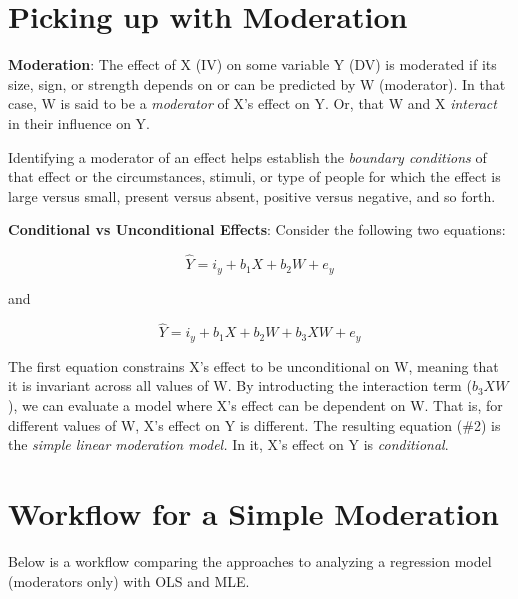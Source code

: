 \documentclass[
  11pt,
]{book}
\begin{document}
\hypertarget{picking-up-with-moderation}{%
\section{Picking up with Moderation}\label{picking-up-with-moderation}}

\textbf{Moderation}: The effect of X (IV) on some variable Y (DV) is moderated if its size, sign, or strength depends on or can be predicted by W (moderator). In that case, W is said to be a \emph{moderator} of X's effect on Y. Or, that W and X \emph{interact} in their influence on Y.

Identifying a moderator of an effect helps establish the \emph{boundary conditions} of that effect or the circumstances, stimuli, or type of people for which the effect is large versus small, present versus absent, positive versus negative, and so forth.

\textbf{Conditional vs Unconditional Effects}: Consider the following two equations:

\[\hat{Y} = i_{y}+b_{1}X + b_{2}W + e_{y}\]

and

\[\hat{Y} = i_{y}+b_{1}X + b_{2}W + b_{3}XW+ e_{y}\]

The first equation constrains X's effect to be unconditional on W, meaning that it is invariant across all values of W. By introducting the interaction term (\(b_{3}XW\)), we can evaluate a model where X's effect can be dependent on W. That is, for different values of W, X's effect on Y is different. The resulting equation (\#2) is the \emph{simple linear moderation model.} In it, X's effect on Y is \emph{conditional}.

\hypertarget{workflow-for-a-simple-moderation}{%
\section{Workflow for a Simple Moderation}\label{workflow-for-a-simple-moderation}}

Below is a workflow comparing the approaches to analyzing a regression model (moderators only) with OLS and MLE.
\end{document}
